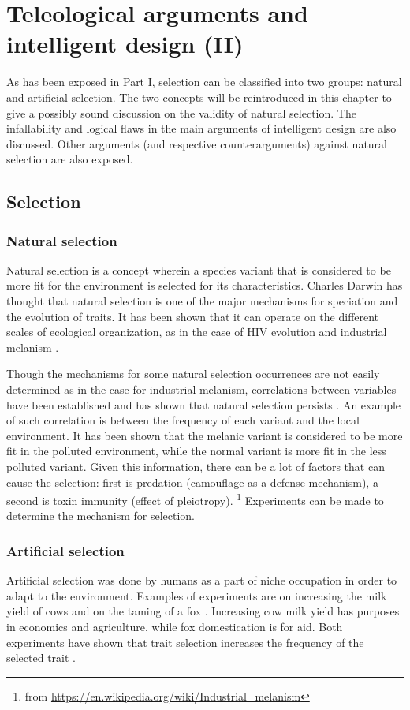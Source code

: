 \chapter{Teleological arguments and intelligent design (II)}

As has been exposed in Part I, selection can be classified into two groups: natural and artificial selection.
The two concepts will be reintroduced in this chapter to give a possibly sound discussion on the validity of natural selection.
The infallability and logical flaws \footnotemark in the main arguments of intelligent design are also discussed.
Other arguments (and respective counterarguments) against natural selection are also exposed.

\section{Selection}
\subsection{Natural selection}
Natural selection is a concept wherein a species variant that is considered to be more fit for the environment is selected for its characteristics.
Charles Darwin has thought that natural selection is one of the major mechanisms for speciation and the evolution of traits.
It has been shown that it can operate on the different scales of ecological organization, as in the case of HIV evolution \cite{Ridley} and industrial melanism \cite{biomain, Ridley}.

Though the mechanisms for some natural selection occurrences are not easily determined as in the case for industrial melanism, correlations between variables have been established and has shown that natural selection persists \cite{Ridley}.
An example of such correlation is between the frequency of each variant and the local environment.
It has been shown that the melanic variant is considered to be more fit in the polluted environment, while the normal variant is more fit in the less polluted variant.
Given this information, there can be a lot of factors that can cause the selection: first is predation (camouflage as a defense mechanism), a second is toxin immunity (effect of pleiotropy).
\footnote{from \url{https://en.wikipedia.org/wiki/Industrial_melanism}}
Experiments can be made to determine the mechanism for selection.

\subsection{Artificial selection}
Artificial selection was done by humans as a part of niche occupation in order to adapt to the environment.
Examples of experiments are on increasing the milk yield of cows \cite{Ridley} and on the taming of a fox \cite{biomain}.
Increasing cow milk yield has purposes in economics and agriculture, while fox domestication is for aid.
Both experiments have shown that trait selection increases the frequency of the selected trait \cite{Ridley}.

